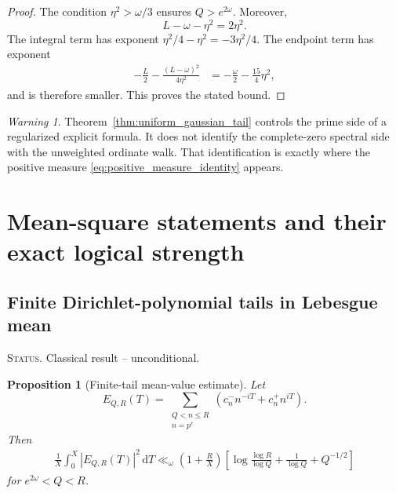 \documentclass[11pt]{amsart}
\numberwithin{equation}{section}
\theoremstyle{plain}
\newtheorem{proposition}[theorem]{Proposition}
\theoremstyle{definition}
\theoremstyle{remark}
\newtheorem{warning}[theorem]{Warning}
\newcommand{\1}{\mathbf{1}}
\newcommand{\dd}{\,\mathrm{d}}
\newcommand{\statusnote}[1]{%
  \par\smallskip\noindent
  \begingroup\footnotesize\textsc{Status.} #1\endgroup
  \par\smallskip}
\begin{document}
\begin{proof}
The condition \(\eta^2>\omega/3\) ensures \(Q>e^{2\omega}\).  Moreover,
\begin{equation}
L-\omega-\eta^2=2\eta^2.
\label{eq:joint_choice_r}
\end{equation}
The integral term has exponent
\(\eta^2/4-\eta^2=-3\eta^2/4\).  The endpoint term has exponent
\begin{align}
-\frac L2-\frac{(L-\omega)^2}{4\eta^2}
&=
-\frac\omega2-\frac{15}{4}\eta^2,
\label{eq:joint_choice_endpoint_exponent}
\end{align}
and is therefore smaller.  This proves the stated bound.
\end{proof}

\begin{warning}
\label{warn:regularized_tail_not_ordinate_formula}
Theorem~\ref{thm:uniform_gaussian_tail} controls the prime side of a
regularized explicit formula.  It does not identify the complete-zero
spectral side with the unweighted ordinate walk.  That identification is
exactly where the positive measure \eqref{eq:positive_measure_identity}
appears.
\end{warning}

\section{Mean-square statements and their exact logical strength}
\label{sec:mean_square_logic}

\subsection{Finite Dirichlet-polynomial tails in Lebesgue mean}
\label{subsec:finite_dirichlet_mean}

\statusnote{Classical result -- unconditional.}
\begin{proposition}[Finite-tail mean-value estimate]
\label{prop:finite_tail_mean_value}
Let
\begin{equation}
E_{Q,R}(T)
=
\sum_{\substack{Q<n\leq R\\n=p^r}}
\left(c_n^-n^{-iT}+c_n^+n^{iT}\right).
\label{eq:finite_tail_ER}
\end{equation}
Then
\begin{align}
\frac1X\int_0^X|E_{Q,R}(T)|^2\dd T
\ll_\omega
\left(1+\frac RX\right)
\left[
\log\frac{\log R}{\log Q}
+
\frac1{\log Q}
+
Q^{-1/2}
\right]
\label{eq:finite_tail_mean_value}
\end{align}
for $e^{2\omega}<Q<R$.
\end{proposition}
\end{document}
